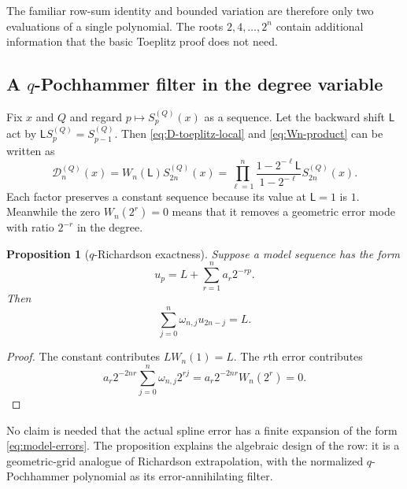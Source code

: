 \documentclass[11pt,oneside]{article}
\newtheorem{proposition}[theorem]{Proposition}
\theoremstyle{definition}
\theoremstyle{remark}
\newcommand{\shiftop}{\mathsf L}
\begin{document}
The familiar row-sum identity and bounded variation are therefore only two evaluations of a
single polynomial.  The roots $2,4,\ldots,2^n$ contain additional information that the basic
Toeplitz proof does not need.

\subsection[A q-Pochhammer filter in the degree variable]{A $q$-Pochhammer filter in the degree variable}

Fix $x$ and $Q$ and regard $p\mapsto S_p^{(Q)}(x)$ as a sequence.  Let the backward shift
$\shiftop$ act by
\(
 \shiftop S_p^{(Q)}=S_{p-1}^{(Q)}.
\)
Then \eqref{eq:D-toeplitz-local} and \eqref{eq:Wn-product} can be written as
\begin{equation}
 \boxed{
 \mathcal D_n^{(Q)}(x)
 =W_n(\shiftop)S_{2n}^{(Q)}(x)
 =\prod_{\ell=1}^{n}
   \frac{1-2^{-\ell}\shiftop}{1-2^{-\ell}}
   S_{2n}^{(Q)}(x).}                                      \label{eq:q-filter-operator}
\end{equation}
Each factor preserves a constant sequence because its value at $\shiftop=1$ is $1$.
Meanwhile the zero $W_n(2^r)=0$ means that it removes a geometric error mode with ratio
$2^{-r}$ in the degree.

\begin{proposition}[$q$-Richardson exactness]
\label{prop:q-richardson}
Suppose a model sequence has the form
\begin{equation}
 u_p=L+\sum_{r=1}^{n}a_r2^{-rp}.                           \label{eq:model-errors}
\end{equation}
Then
\begin{equation}
 \sum_{j=0}^{n}\omega_{n,j}u_{2n-j}=L.                    \label{eq:q-richardson}
\end{equation}
\end{proposition}

\begin{proof}
The constant contributes $L W_n(1)=L$.  The $r$th error contributes
\[
 a_r2^{-2nr}\sum_{j=0}^{n}\omega_{n,j}2^{rj}
 =a_r2^{-2nr}W_n(2^r)=0.
\]
\end{proof}

No claim is needed that the actual spline error has a finite expansion of the form
\eqref{eq:model-errors}.  The proposition explains the algebraic design of the row: it is a
geometric-grid analogue of Richardson extrapolation, with the normalized $q$-Pochhammer
polynomial as its error-annihilating filter.
\end{document}
